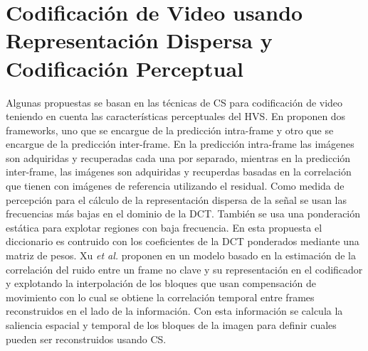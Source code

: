 \section{Codificaci\'on de Video usando Representaci\'on Dispersa y Codificaci\'on Perceptual}
\label{sec:codificacion_dispersa_perceptual}

Algunas propuestas se basan en las t\'ecnicas de CS para codificaci\'on de video teniendo en cuenta las caracter\'isticas perceptuales del HVS. En \cite{elsayed_perceptual-based_2015} proponen dos frameworks, uno que se encargue de la predicci\'on intra-frame y otro que se encargue de la predicci\'on inter-frame. En la predicci\'on intra-frame las im\'agenes son adquiridas y recuperadas cada una por separado, mientras en la predicci\'on inter-frame, las im\'agenes son adquiridas y recuperdas basadas en la correlaci\'on que tienen con im\'agenes de referencia utilizando el residual. Como medida de percepci\'on para el c\'alculo de la representaci\'on dispersa de la se\~nal se usan las frecuencias m\'as bajas en el dominio
de la DCT. Tambi\'en se usa una ponderaci\'on est\'atica para explotar regiones con baja frecuencia. En esta propuesta el diccionario es contruido con los coeficientes de la DCT ponderados mediante una matriz de pesos. Xu \textit{et al.} proponen en \cite{xu_perceptually-aware_2015} un modelo basado en la estimaci\'on de la correlaci\'on del ruido entre un frame no clave y su representaci\'on en el codificador y explotando la interpolaci\'on de los bloques que usan compensaci\'on de movimiento con lo cual se obtiene la correlaci\'on temporal entre frames reconstruidos en el lado de la informaci\'on. Con esta informaci\'on se calcula la saliencia espacial y temporal de los bloques de la imagen para definir cuales pueden ser reconstruidos usando CS. 


